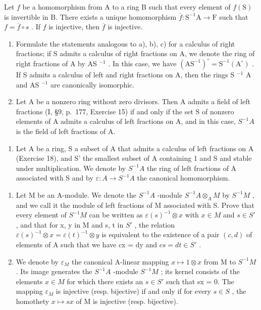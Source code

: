 Let \(f\) be a homomorphism from A to a ring B such that every element of \(f(\mathrm{S})\) is invertible in B. There exists a unique homomorphism \(\overline{f} : \mathrm{S}^{-1}\mathrm{A} \to \mathrm{F}\) such that \(f = \overline{f} \circ s\) . If \(f\) is injective, then \(\overline{f}\) is injective.

\begin{enumerate}
\def\labelenumi{\alph{enumi})}
\setcounter{enumi}{3}
\item
  Formulate the statements analogous to a), b), c) for a calculus of right fractions; if S admits a calculus of right fractions on A, we denote the ring of right fractions of A by AS \(^{-1}\) . In this case, we have \((\mathrm{AS}^{-1})^{\circ} = \mathrm{S}^{-1}(\mathrm{A}^{\circ})\) . If S admits a calculus of left and right fractions on A, then the rings S \(^{-1}\) A and AS \(^{-1}\) are canonically isomorphic.
\item
  Let A be a nonzero ring without zero divisors. Then A admits a field of left fractions (I, §9, p.~177, Exercise 15) if and only if the set S of nonzero elements of A admits a calculus of left fractions on A, and in this case, \(S^{-1}A\) is the field of left fractions of A.
\end{enumerate}

\begin{enumerate}
\def\labelenumi{\arabic{enumi})}
\setcounter{enumi}{18}
\tightlist
\item
  Let A be a ring, S a subset of A that admits a calculus of left fractions on A (Exercise 18), and S' the smallest subset of A containing 1 and S and stable under multiplication. We denote by \(S^{-1}A\) the ring of left fractions of A associated with S and by \(\varepsilon:A\to S^{-1}A\) the canonical homomorphism.
\end{enumerate}

\begin{enumerate}
\def\labelenumi{\alph{enumi})}
\item
  Let M be an A-module. We denote the \(S^{-1}A\) -module \(S^{-1}A \otimes_{A} M\) by \(S^{-1}M\) , and we call it the module of left fractions of M associated with S. Prove that every element of \(S^{-1}M\) can be written as \(\varepsilon(s)^{-1} \otimes x\) with \(x \in M\) and \(s \in S'\) , and that for x, y in M and s, t in \(S'\) , the relation \(\varepsilon(s)^{-1} \otimes x = \varepsilon(t)^{-1} \otimes y\) is equivalent to the existence of a pair \((c, d)\) of elements of A such that we have cx = dy and \(cs = dt \in S'\) .
\item
  We denote by \(\varepsilon_{M}\) the canonical A-linear mapping \(x \mapsto 1 \otimes x\) from M to \(S^{-1}M\) . Its image generates the \(S^{-1}A\) -module \(S^{-1}M\) ; its kernel consists of the elements \(x \in M\) for which there exists an \(s \in S'\) such that sx = 0. The mapping \(\varepsilon_{M}\) is injective (resp. bijective) if and only if for every \(s \in S\) , the homothety \(x \mapsto sx\) of M is injective (resp. bijective).
\end{enumerate}

